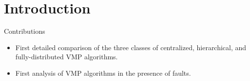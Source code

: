 \section{Introduction}
\label{sec:intro}

Contributions
\begin{itemize}
  \item First detailed comparison of the three classes of centralized,
    hierarchical, and fully-distributed VMP algorithms.
  \item First analysis of VMP algorithms in the presence of faults.
\end{itemize}



